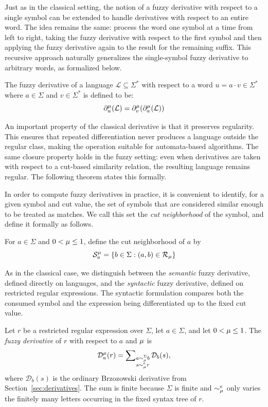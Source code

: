 \noindent
Just as in the classical setting, the notion of a fuzzy derivative with respect to a single symbol can be extended to handle derivatives with respect to an entire word. The idea remains the same: process the word one symbol at a time from left to right, taking the fuzzy derivative with respect to the first symbol and then applying the fuzzy derivative again to the result for the remaining suffix. This recursive approach naturally generalizes the single-symbol fuzzy derivative to arbitrary words, as formalized below.


\begin{definition}\label{def:fuzzy-word-derivative}
    The fuzzy derivative of a language $\mathcal{L} \subseteq \Sigma^*$ with respect to a word $u=a\cdot v \in \Sigma^*$ where $a \in \Sigma$ and $v \in \Sigma^*$ is defined to be:
    $$
    \partial^\mu_u(\mathcal{L}) = \partial^\mu_v(\partial^\mu_a(\mathcal{L}))
    $$
\end{definition}


\noindent
An important property of the classical derivative is that it preserves regularity. This ensures that repeated differentiation never produces a language outside the regular class, making the operation suitable for automata-based  algorithms. The same closure property holds in the fuzzy setting: even when derivatives are taken with respect to a cut-based similarity relation, the resulting language remains regular. The following theorem states this formally.


\noindent
In order to compute fuzzy derivatives in practice, it is convenient to identify, for a given symbol and cut value, the set of symbols that are considered similar enough to be treated as matches. We call this set the \emph{cut neighborhood} of the symbol, and define it formally as follows.


\begin{definition}\label{def:cut-neighborhood}
    For $a\in\Sigma$ and $0<\mu\le 1$, define the cut neighborhood of $a$ by
    $$
        \mathcal{S}^\mu_a = \{b \in\Sigma :  (a,b)\in\mathcal{R}_\mu\}
    $$
\end{definition}
\noindent
As in the classical case, we distinguish between the \emph{semantic} fuzzy
derivative, defined directly on languages, and the \emph{syntactic} fuzzy
derivative, defined on restricted regular expressions. The syntactic formulation compares
both the consumed symbol and the expression being differentiated up to the fixed
cut value.

\begin{definition}\label{def:regex-fuzzy-derivative}
Let $r$ be a restricted regular expression over $\Sigma$, let $a\in\Sigma$, and let
$0<\mu\le 1$. The \emph{fuzzy derivative} of $r$ with respect to $a$ and
$\mu$ is
\[
  \mathcal D_a^\mu(r)
  =
  \sum\nolimits_{\substack{a\sim_\mu^\Sigma b\\ s\sim_\mu^e r}}
  \mathcal D_b(s),
\]
where $\mathcal D_b(s)$ is the ordinary Brzozowski derivative from
Section~\ref{sec:derivatives}. The sum is finite because $\Sigma$ is finite
and $\sim_\mu^e$ only varies the finitely many letters occurring in the fixed
syntax tree of $r$.
\end{definition}

